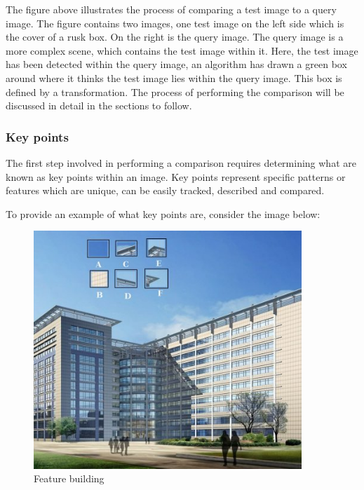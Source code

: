 \documentclass[11pt,a4paper]{report}
\begin{document}
				The figure above illustrates the process of comparing a test image to a query image. The figure contains two images, one test image on the left side which is the cover of a rusk box. On the right is the query image. The query image is a more complex scene, which contains the test image within it. Here, the test image has been detected within the query image, an algorithm has drawn a green box around where it thinks the test image lies within the query image. This box is defined by a transformation. The process of performing the comparison will be discussed in detail in the sections to follow.
			
			\subsubsection{Key points}
				The first step involved in performing a comparison requires determining what are known as key points within an image. Key points represent specific patterns or features which are unique, can be easily tracked, described and compared.
				
				To provide an example of what key points are, consider the image below:
				
				\begin{figure}[H]
					\centering
					\includegraphics[width=0.9\textwidth]{feature_building}
					\caption{Feature building}
					\label{fig:feature_building}
				\end{figure}
				
\end{document}
